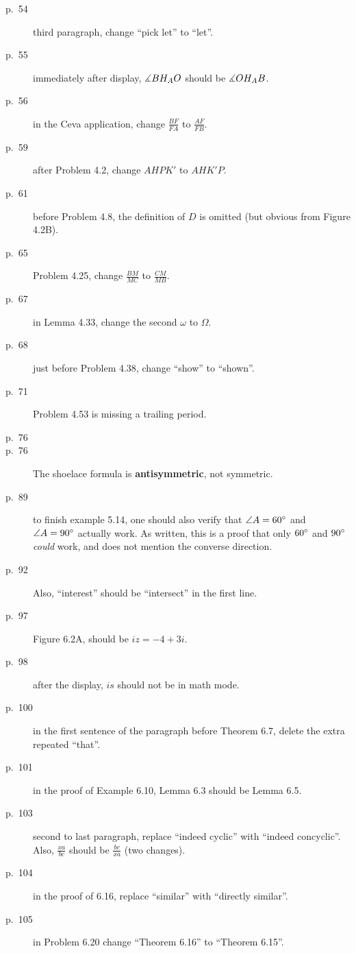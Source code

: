 \documentclass[11pt]{scrartcl}
\begin{document}
\begin{description}
\item[p.\  54] third paragraph, change ``pick let'' to ``let''.
\item[p.\  55] immediately after display, $\measuredangle BH_AO$ should be $\measuredangle OH_AB$.
\item[p.\  56] in the Ceva application, change $\frac{BF}{FA}$ to $\frac{AF}{FB}$.
\item[p.\  59] after Problem 4.2, change $AHPK'$ to $AHK'P$.
\item[p.\  61] before Problem 4.8, the definition of $D$ is omitted (but obvious from Figure 4.2B).
\item[p.\  65] Problem 4.25, change $\frac{BM}{MC}$ to $\frac{CM}{MB}$.
\item[p.\  67] in Lemma 4.33, change the second $\omega$ to $\Omega$.
\item[p.\  68] just before Problem 4.38, change ``show'' to ``shown''.
\item[p.\  71] Problem 4.53 is missing a trailing period.
\item[p.\  76] 
\item[p.\  76] The shoelace formula is \textbf{antisymmetric}, not symmetric.
\item[p.\  89] to finish example 5.14, one should also verify that $\angle A = 60^\circ$
  and $\angle A = 90^\circ$ actually work.
  As written, this is a proof that only $60^\circ$ and $90^\circ$ \emph{could} work,
  and does not mention the converse direction.
\item[p.\  92] 
  Also, ``interest'' should be ``intersect'' in the first line.
\item[p.\  97] Figure 6.2A, should be $iz = -4+3i$.
\item[p.\  98] after the display, $is$ should not be in math mode.
\item[p.\  100] in the first sentence of the paragraph before Theorem 6.7,
  delete the extra repeated ``that''.
\item[p.\  101] in the proof of Example 6.10, Lemma 6.3 should be Lemma 6.5.
\item[p.\  103] second to last paragraph, replace ``indeed cyclic'' with ``indeed concyclic''.
  Also, $\frac{xa}{bc}$ should be $\frac{bc}{xa}$ (two changes).
\item[p.\  104] in the proof of 6.16, replace ``similar'' with ``directly similar''.
\item[p.\  105] in Problem 6.20 change ``Theorem 6.16'' to ``Theorem 6.15''.

\end{description}
\end{document}

